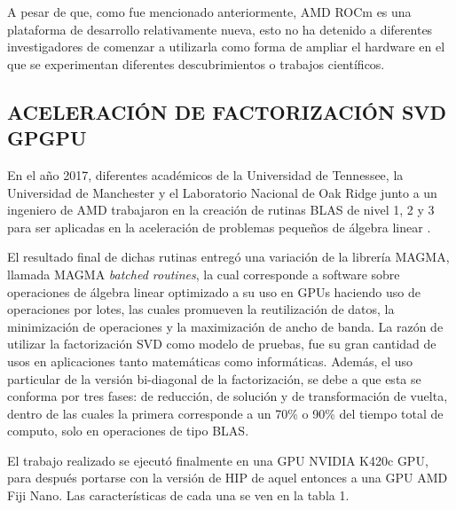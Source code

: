 
A pesar de que, como fue mencionado anteriormente, AMD ROCm es una plataforma de desarrollo relativamente nueva, esto no ha detenido a diferentes investigadores de comenzar a utilizarla como forma de ampliar el hardware en el que se experimentan diferentes descubrimientos o trabajos científicos.

\subsection{ACELERACIÓN DE FACTORIZACIÓN SVD GPGPU}

En el año 2017, diferentes académicos de la Universidad de Tennessee, la Universidad de Manchester y el Laboratorio Nacional de Oak Ridge junto a un ingeniero de AMD trabajaron en la creación de rutinas BLAS de nivel 1, 2 y 3 para ser aplicadas en la aceleración de problemas pequeños de álgebra linear \cite{svd}.

El resultado final de dichas rutinas entregó una variación de la librería MAGMA, llamada MAGMA \textit{batched routines}, la cual corresponde a software sobre operaciones de álgebra linear optimizado a su uso en GPUs haciendo uso de operaciones por lotes, las cuales promueven la reutilización de datos, la minimización de operaciones y la maximización de ancho de banda.
La razón de utilizar la factorización SVD como modelo de pruebas, fue su gran cantidad de usos en aplicaciones tanto matemáticas como informáticas. 
Además, el uso particular de la versión bi-diagonal de la factorización, se debe 
a que esta se conforma por tres fases: de reducción, de solución y de transformación de vuelta, dentro de las cuales la primera corresponde a un 70\% o 90\% del tiempo total de computo, solo en operaciones de tipo BLAS.

El trabajo realizado se ejecutó finalmente en una GPU NVIDIA K420c GPU, para después portarse con la versión de HIP de aquel entonces a una GPU AMD Fiji Nano. Las características de cada una se ven en la tabla 1.

